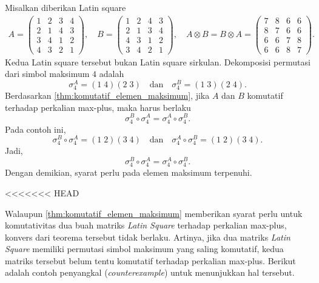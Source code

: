 \begin{contoh}\label{contoh:syarat_perlu_elemen_maksimum_ordo_4}
  Misalkan diberikan Latin square
  \begin{align*}
    A=
    \begin{pmatrix}
      1 & 2 & 3 & 4 \\
      2 & 1 & 4 & 3 \\
      3 & 4 & 1 & 2 \\
      4 & 3 & 2 & 1
    \end{pmatrix},\quad B=
    \begin{pmatrix}
      1 & 2 & 4 & 3 \\
      2 & 1 & 3 & 4 \\
      4 & 3 & 1 & 2 \\
      3 & 4 & 2 & 1
    \end{pmatrix},
    \quad A\otimes B
    =
    B\otimes A
    =
    \begin{pmatrix}
      7 & 8 & 6 & 6 \\
      8 & 7 & 6 & 6 \\
      6 & 6 & 7 & 8 \\
      6 & 6 & 8 & 7
    \end{pmatrix}.
  \end{align*}
  Kedua Latin square tersebut bukan Latin square sirkulan. Dekomposisi permutasi dari simbol maksimum $4$ adalah
  \[
    \sigma_4^A=(1\;4)(2\;3)
    \quad\text{dan}\quad
    \sigma_4^B=(1\;3)(2\;4).
  \]
  Berdasarkan \autoref{thm:komutatif_elemen_maksimum}, jika $A$ dan $B$ komutatif terhadap perkalian max-plus, maka harus berlaku
  \[
    \sigma_4^B\circ\sigma_4^A
    =
    \sigma_4^A\circ\sigma_4^B.
  \]
  Pada contoh ini,
  \[
    \sigma_4^B\circ\sigma_4^A
    =
    (1\;2)(3\;4)
    \quad
    \text{dan}
    \quad
    \sigma_4^A\circ\sigma_4^B
    =
    (1\;2)(3\;4).
  \]
  Jadi,
  \[
    \sigma_4^B\circ\sigma_4^A
    =
    \sigma_4^A\circ\sigma_4^B.
  \]
  Dengan demikian, syarat perlu pada elemen maksimum terpenuhi.
\end{contoh}
<<<<<<< HEAD

Walaupun \autoref{thm:komutatif_elemen_maksimum} memberikan syarat perlu untuk komutativitas dua buah matriks \emph{Latin Square} terhadap perkalian max-plus, konvers dari teorema tersebut tidak berlaku. Artinya, jika dua matriks \emph{Latin Square} memiliki permutasi simbol maksimum yang saling komutatif, kedua matriks tersebut belum tentu komutatif terhadap perkalian max-plus. Berikut adalah contoh penyangkal (\emph{counterexample}) untuk menunjukkan hal tersebut.

